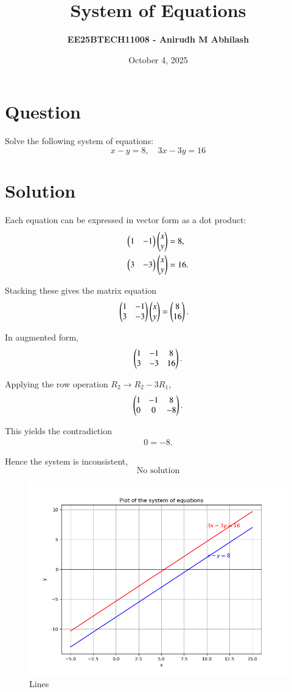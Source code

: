 \documentclass[12pt]{article}
\title{\textbf{System of Equations}}
\author{\textbf{EE25BTECH11008 - Anirudh M Abhilash}}
\date{October 4, 2025}
\begin{document}
\maketitle

\section*{Question}

Solve the following system of equations:
\[
x - y = 8, \quad 3x - 3y = 16
\]

\section*{Solution}

Each equation can be expressed in vector form as a dot product:
\begin{align}
\begin{pmatrix}1 & -1\end{pmatrix}\begin{pmatrix}x \\ y\end{pmatrix} &= 8, \\
\begin{pmatrix}3 & -3\end{pmatrix}\begin{pmatrix}x \\ y\end{pmatrix} &= 16.
\end{align}

Stacking these gives the matrix equation
\begin{align}
\begin{pmatrix}1 & -1 \\ 3 & -3\end{pmatrix}\begin{pmatrix}x \\ y\end{pmatrix} &= \begin{pmatrix}8 \\ 16\end{pmatrix}.
\end{align}

In augmented form,
\begin{align}
\begin{pmatrix}1 & -1 & 8 \\ 3 & -3 & 16\end{pmatrix}.
\end{align}

Applying the row operation $R_2 \to R_2 - 3R_1$,
\begin{align}
\begin{pmatrix}1 & -1 & 8 \\ 0 & 0 & -8\end{pmatrix}.
\end{align}

This yields the contradiction
\begin{align}
0 = -8.
\end{align}

Hence the system is inconsistent,
\[
\boxed{\text{No solution}}
\]

\begin{figure}[H]\centering
\includegraphics[width=1\columnwidth]{figs/plt.png}
\caption{Lines}
\label{fig:plt}
\end{figure}
\end{document}
